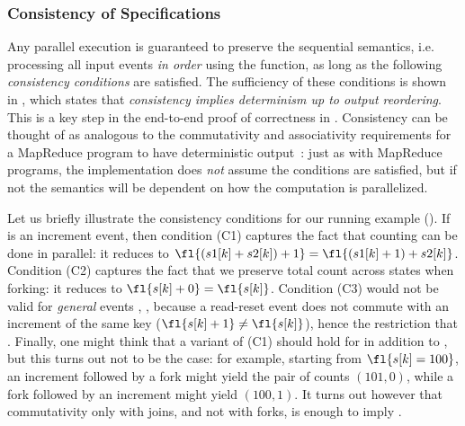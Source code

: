 \subsubsection{Consistency of Specifications}
\label{ssec:prog-model-correctness}

Any parallel execution
is guaranteed to preserve the sequential semantics, i.e. processing
all input events \emph{in order} using the  function,
as long as the following \emph{consistency conditions} are
satisfied.
The sufficiency of these conditions is shown in
, which states
that \emph{consistency implies determinism up to output reordering}.
This is a key step in the end-to-end proof of correctness in .
Consistency can be thought of as analogous to the commutativity and
associativity requirements for a MapReduce program to have
deterministic output~\cite{dean2008map-reduce}: just as with MapReduce
programs, the implementation does \emph{not} assume the conditions are
satisfied, but if not the semantics will be dependent on how the
computation is parallelized.

Let us briefly illustrate the consistency conditions for our running example
().
If  is an increment event,
then condition (C1) captures the fact that counting can be done in parallel:
it reduces to $\fl{(s1[k] + s2[k]) + 1} = \fl{(s1[k] + 1) + s2[k]}$.
Condition (C2) captures the fact that we preserve total count
across states when forking: it reduces to $\fl{s[k] + 0} = \fl{s[k]}$.
Condition (C3) would not be valid for \emph{general} events
, , because a read-reset event does not commute with an increment
of the same key ($\fl{s[k] + 1} \ne \fl{s[k]}$),
hence the restriction that .
Finally, one might think that a variant of (C1) should hold for
 in addition to ,
but this turns out not to be the case:
for example, starting from $\fl{s[k] = 100}$,
an increment followed by a fork might yield the pair of counts
$(101, 0)$, while a fork followed by an increment might yield
$(100, 1)$.
It turns out however that commutativity only with joins, and not with
forks, is enough to imply .

